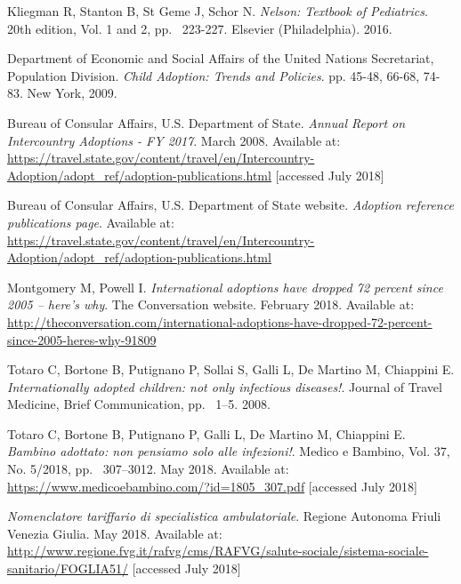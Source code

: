 
\begin{thebibliography}{50}

  Kliegman R, Stanton B, St Geme J, Schor N.
  \textit{Nelson: Textbook of Pediatrics}.
  20th edition, Vol. 1 and 2,
  pp. ~223-227.
  Elsevier (Philadelphia).
  2016.
  
  Department of Economic and Social Affairs of the United Nations Secretariat, Population Division.
  \textit{Child Adoption: Trends and Policies}.
  pp. 45-48, 66-68, 74-83.
  New York,
  2009.

  Bureau of Consular Affairs, U.S. Department of State.
  \textit{Annual Report on Intercountry Adoptions - FY 2017}.
  March 2008.
  Available at: \url{https://travel.state.gov/content/travel/en/Intercountry-Adoption/adopt_ref/adoption-publications.html} [accessed July 2018]
  
  Bureau of Consular Affairs, U.S. Department of State website.
  \textit{Adoption reference publications page}.
  Available at: \url{https://travel.state.gov/content/travel/en/Intercountry-Adoption/adopt_ref/adoption-publications.html}

  Montgomery M, Powell I.
  \textit{International adoptions have dropped 72 percent since 2005 – here’s why}.
  The Conversation website.
  February 2018.
  Available at: \url{http://theconversation.com/international-adoptions-have-dropped-72-percent-since-2005-heres-why-91809}
  
  Totaro C, Bortone B, Putignano P, Sollai S, Galli L, De Martino M, Chiappini E.
  \textit{Internationally adopted children: not only infectious diseases!}.
  Journal of Travel Medicine,
  Brief Communication,
  pp. ~1–5.
  2008.
  
  Totaro C, Bortone B, Putignano P, Galli L, De Martino M, Chiappini E.
  \textit{Bambino adottato: non pensiamo solo alle infezioni!}.
  Medico e Bambino, Vol. 37, No. 5/2018,
  pp. ~307–3012.
  May 2018.
  Available at: \url{https://www.medicoebambino.com/?id=1805_307.pdf} [accessed July 2018]
  
  \textit{Nomenclatore tariffario di specialistica ambulatoriale}.
  Regione Autonoma Friuli Venezia Giulia.
  May 2018.
  Available at: \url{http://www.regione.fvg.it/rafvg/cms/RAFVG/salute-sociale/sistema-sociale-sanitario/FOGLIA51/} [accessed July 2018]

\end{thebibliography}